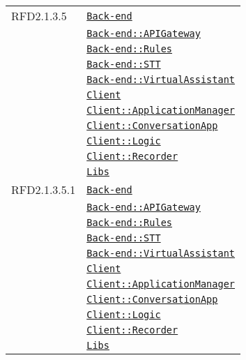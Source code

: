 \begin{longtable}{|>{\centering}m{3cm}|m{10cm}<{\centering}|}
RFD2.1.3.5 & \hyperref[Back-end]{\texttt{Back-end}}\\
& \hyperref[Back-end::APIGateway]{\texttt{Back-end::APIGateway}}\\
& \hyperref[Back-end::Rules]{\texttt{Back-end::Rules}}\\
& \hyperref[Back-end::STT]{\texttt{Back-end::STT}}\\
& \hyperref[Back-end::VirtualAssistant]{\texttt{Back-end::VirtualAssistant}}\\
& \hyperref[Client]{\texttt{Client}}\\
& \hyperref[Client::ApplicationManager]{\texttt{Client::ApplicationManager}}\\
& \hyperref[Client::ConversationApp]{\texttt{Client::ConversationApp}}\\
& \hyperref[Client::Logic]{\texttt{Client::Logic}}\\
& \hyperref[Client::Recorder]{\texttt{Client::Recorder}}\\
& \hyperref[Libs]{\texttt{Libs}}\\ \hline

RFD2.1.3.5.1 & \hyperref[Back-end]{\texttt{Back-end}}\\
& \hyperref[Back-end::APIGateway]{\texttt{Back-end::APIGateway}}\\
& \hyperref[Back-end::Rules]{\texttt{Back-end::Rules}}\\
& \hyperref[Back-end::STT]{\texttt{Back-end::STT}}\\
& \hyperref[Back-end::VirtualAssistant]{\texttt{Back-end::VirtualAssistant}}\\
& \hyperref[Client]{\texttt{Client}}\\
& \hyperref[Client::ApplicationManager]{\texttt{Client::ApplicationManager}}\\
& \hyperref[Client::ConversationApp]{\texttt{Client::ConversationApp}}\\
& \hyperref[Client::Logic]{\texttt{Client::Logic}}\\
& \hyperref[Client::Recorder]{\texttt{Client::Recorder}}\\
& \hyperref[Libs]{\texttt{Libs}}\\ \hline


\end{longtable}
